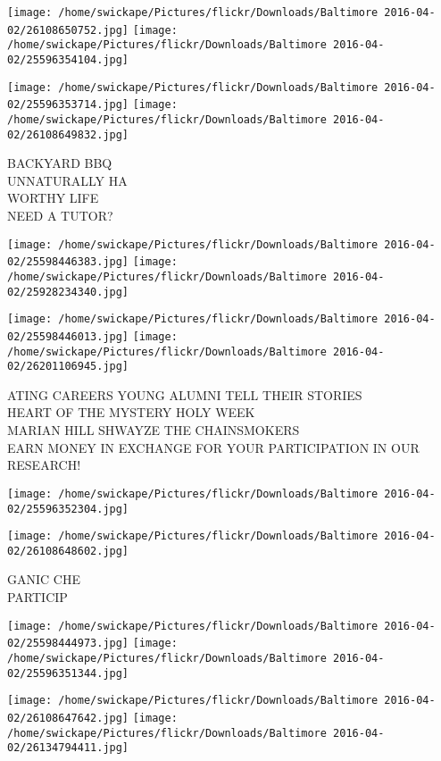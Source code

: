 \documentclass[10pt,letterpaper]{article}
\begin{document}
\texttt{[image: /home/swickape/Pictures/flickr/Downloads/Baltimore 2016-04-02/26108650752.jpg]}
\texttt{[image: /home/swickape/Pictures/flickr/Downloads/Baltimore 2016-04-02/25596354104.jpg]}

\texttt{[image: /home/swickape/Pictures/flickr/Downloads/Baltimore 2016-04-02/25596353714.jpg]}
\texttt{[image: /home/swickape/Pictures/flickr/Downloads/Baltimore 2016-04-02/26108649832.jpg]}

BACKYARD BBQ\\
UNNATURALLY HA\\
WORTHY LIFE\\
NEED A TUTOR?\\
\pagebreak

\texttt{[image: /home/swickape/Pictures/flickr/Downloads/Baltimore 2016-04-02/25598446383.jpg]}
\texttt{[image: /home/swickape/Pictures/flickr/Downloads/Baltimore 2016-04-02/25928234340.jpg]}

\texttt{[image: /home/swickape/Pictures/flickr/Downloads/Baltimore 2016-04-02/25598446013.jpg]}
\texttt{[image: /home/swickape/Pictures/flickr/Downloads/Baltimore 2016-04-02/26201106945.jpg]}

ATING CAREERS YOUNG ALUMNI TELL THEIR STORIES\\
HEART OF THE MYSTERY HOLY WEEK\\
MARIAN HILL SHWAYZE THE CHAINSMOKERS\\
EARN MONEY IN EXCHANGE FOR YOUR PARTICIPATION IN OUR RESEARCH!\\
\pagebreak

\texttt{[image: /home/swickape/Pictures/flickr/Downloads/Baltimore 2016-04-02/25596352304.jpg]}

\vspace{0.25in}
\texttt{[image: /home/swickape/Pictures/flickr/Downloads/Baltimore 2016-04-02/26108648602.jpg]}

GANIC CHE\\
PARTICIP\\
\pagebreak

\texttt{[image: /home/swickape/Pictures/flickr/Downloads/Baltimore 2016-04-02/25598444973.jpg]}
\texttt{[image: /home/swickape/Pictures/flickr/Downloads/Baltimore 2016-04-02/25596351344.jpg]}

\texttt{[image: /home/swickape/Pictures/flickr/Downloads/Baltimore 2016-04-02/26108647642.jpg]}
\texttt{[image: /home/swickape/Pictures/flickr/Downloads/Baltimore 2016-04-02/26134794411.jpg]}
\end{document}

